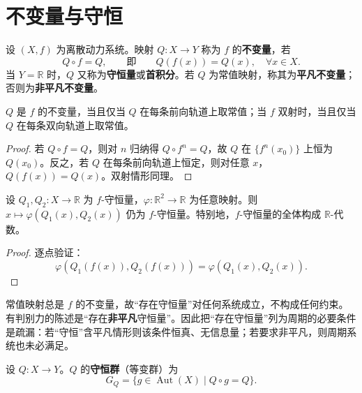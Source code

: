 \section{不变量与守恒}
\label{sec:invariants_conservation}

\begin{definition}\label{def:invariant}
设 $(X,f)$ 为离散动力系统。映射 $Q:X\to Y$ 称为 $f$ 的\textbf{不变量}，若
\[
Q\circ f=Q,\qquad\text{即}\qquad Q(f(x))=Q(x),\quad\forall x\in X.
\]
当 $Y=\mathbb{R}$ 时，$Q$ 又称为\textbf{守恒量}或\textbf{首积分}。若 $Q$ 为常值映射，称其为\textbf{平凡不变量}；否则为\textbf{非平凡不变量}。
\end{definition}

\begin{proposition}[不变量的轨道刻划]\label{prop:invariant_orbit}
$Q$ 是 $f$ 的不变量，当且仅当 $Q$ 在每条前向轨道上取常值；当 $f$ 双射时，当且仅当 $Q$ 在每条双向轨道上取常值。
\end{proposition}

\begin{proof}
若 $Q\circ f=Q$，则对 $n$ 归纳得 $Q\circ f^n=Q$，故 $Q$ 在 $\{f^n(x_0)\}$ 上恒为 $Q(x_0)$。反之，若 $Q$ 在每条前向轨道上恒定，则对任意 $x$，$Q(f(x))=Q(x)$。双射情形同理。
\end{proof}

\begin{property}[不变量的代数封闭性]\label{prop:invariant_algebra}
设 $Q_1,Q_2:X\to\mathbb{R}$ 为 $f$-守恒量，$\varphi:\mathbb{R}^2\to\mathbb{R}$ 为任意映射。则 $x\mapsto\varphi(Q_1(x),Q_2(x))$ 仍为 $f$-守恒量。特别地，$f$-守恒量的全体构成 $\mathbb{R}$-代数。
\end{property}

\begin{proof}
逐点验证：
\[
\varphi(Q_1(f(x)),Q_2(f(x)))=\varphi(Q_1(x),Q_2(x)).
\]
\end{proof}

\begin{remark}\label{rem:trivial_invariant}
常值映射总是 $f$ 的不变量，故“存在守恒量”对任何系统成立，不构成任何约束。有判别力的陈述是“存在\textbf{非平凡}守恒量”。因此把“存在守恒量”列为周期的必要条件是疏漏：若“守恒”含平凡情形则该条件恒真、无信息量；若要求非平凡，则周期系统也未必满足。
\end{remark}

\begin{definition}[守恒群]\label{def:conservation_group}
设 $Q:X\to Y$。$Q$ 的\textbf{守恒群}（等变群）为
\[
G_Q=\{g\in\operatorname{Aut}(X)\mid Q\circ g=Q\}.
\]
\end{definition}

